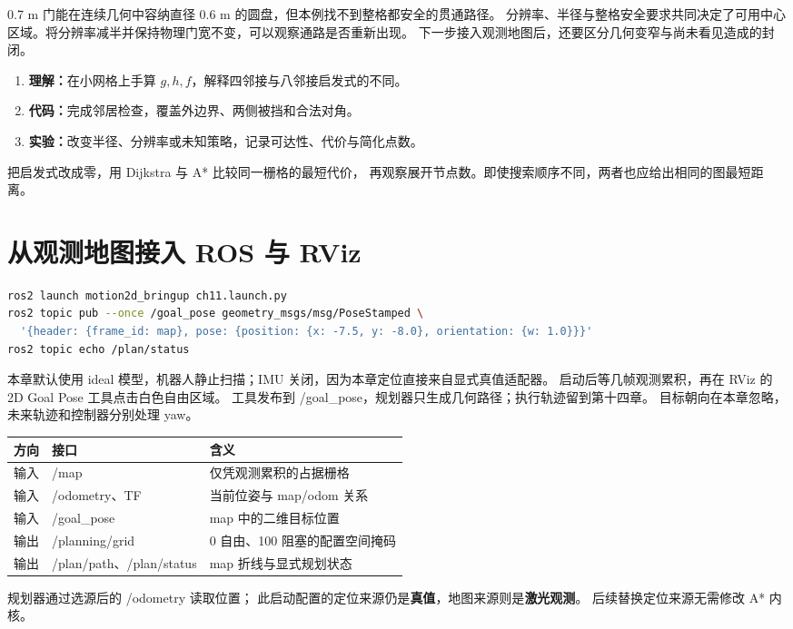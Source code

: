 0.7 m 门能在连续几何中容纳直径 0.6 m 的圆盘，但本例找不到整格都安全的贯通路径。
分辨率、半径与整格安全要求共同决定了可用中心区域。将分辨率减半并保持物理门宽不变，可以观察通路是否重新出现。
下一步接入观测地图后，还要区分几何变窄与尚未看见造成的封闭。

\begin{enumerate}
\item \textbf{理解：}在小网格上手算 $g,h,f$，解释四邻接与八邻接启发式的不同。
\item \textbf{代码：}完成邻居检查，覆盖外边界、两侧被挡和合法对角。
\item \textbf{实验：}改变半径、分辨率或未知策略，记录可达性、代价与简化点数。
\end{enumerate}
把启发式改成零，用 Dijkstra 与 A* 比较同一栅格的最短代价，
再观察展开节点数。即使搜索顺序不同，两者也应给出相同的图最短距离。

\clearpage
\section{从观测地图接入 ROS 与 RViz}
\begin{lstlisting}[language=bash]
ros2 launch motion2d_bringup ch11.launch.py
ros2 topic pub --once /goal_pose geometry_msgs/msg/PoseStamped \
  '{header: {frame_id: map}, pose: {position: {x: -7.5, y: -8.0}, orientation: {w: 1.0}}}'
ros2 topic echo /plan/status
\end{lstlisting}
本章默认使用 ideal 模型，机器人静止扫描；IMU 关闭，因为本章定位直接来自显式真值适配器。
启动后等几帧观测累积，再在 RViz 的 2D Goal Pose 工具点击白色自由区域。
工具发布到 /goal\_pose，规划器只生成几何路径；执行轨迹留到第十四章。
目标朝向在本章忽略，未来轨迹和控制器分别处理 yaw。

\begin{center}\small
\begin{tabular}{lll}\toprule
方向 & 接口 & 含义 \\\midrule
输入 & /map & 仅凭观测累积的占据栅格 \\
输入 & /odometry、TF & 当前位姿与 map/odom 关系 \\
输入 & /goal\_pose & map 中的二维目标位置 \\
输出 & /planning/grid & 0 自由、100 阻塞的配置空间掩码 \\
输出 & /plan/path、/plan/status & map 折线与显式规划状态 \\\bottomrule
\end{tabular}
\end{center}
规划器通过选源后的 /odometry 读取位置；
此启动配置的定位来源仍是\textbf{真值}，地图来源则是\textbf{激光观测}。
后续替换定位来源无需修改 A* 内核。

